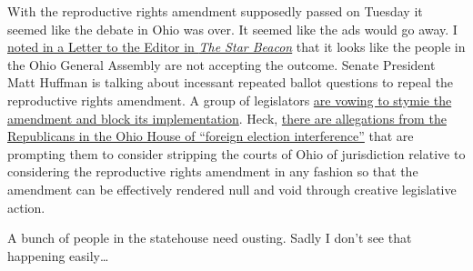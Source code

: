 With the reproductive rights amendment supposedly passed on Tuesday it
seemed like the debate in Ohio was over. It seemed like the ads would go
away. I
\href{http://web.archive.org/web/20231112064100/https://www.starbeacon.com/opinion/ohio-gop-right-back-at-it/article_8e0367e2-801d-11ee-93a5-e3a747bad3e1.html}{noted
in a Letter to the Editor in \emph{The Star Beacon}} that it looks like
the people in the Ohio General Assembly are not accepting the outcome.
Senate President Matt Huffman is talking about incessant repeated ballot
questions to repeal the reproductive rights amendment. A group of
legislators
\href{https://web.archive.org/web/20231111145003/https://www.wkbn.com/news/local-news/issue-1-in-for-fight-legislators-react-to-passage/}{are
vowing to stymie the amendment and block its implementation}. Heck,
\href{https://web.archive.org/web/20231111113838/https://ohiohouse.gov/news/republican/deceptive-ohio-issue-1-misled-the-public-but-doesnt-repeal-our-laws-117412}{there
are allegations from the Republicans in the Ohio House of ``foreign
election interference''} that are prompting them to consider stripping
the courts of Ohio of jurisdiction relative to considering the
reproductive rights amendment in any fashion so that the amendment can
be effectively rendered null and void through creative legislative
action.

A bunch of people in the statehouse need ousting. Sadly I don't see that
happening easily\ldots{}
